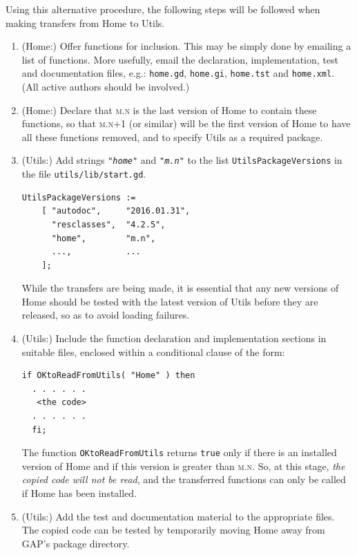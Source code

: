 \documentclass[a4paper,11pt]{report}
\begin{document}
{ Using this alternative procedure, the following steps will be followed when
making transfers from \textsf{Home} to \textsf{Utils}. 
\begin{enumerate}
\item  (\textsf{Home}:) Offer functions for inclusion. This may be simply done by emailing a list
of functions. More usefully, email the declaration, implementation, test and
documentation files, e.g.: \texttt{home.gd}, \texttt{home.gi}, \texttt{home.tst} and \texttt{home.xml}. (All active authors should be involved.) 
\item  (\textsf{Home}:) Declare that \textsc{m.n} is the last version of \textsf{Home} to contain these functions, so that \textsc{m.n+1} (or similar) will be the first version of \textsf{Home} to have all these functions removed, and to specify \textsf{Utils} as a required package. 
\item  (\textsf{Utils}:) Add strings \mbox{\texttt{\mdseries\slshape "home"}} and \mbox{\texttt{\mdseries\slshape "m.n"}} to the list \texttt{UtilsPackageVersions} in the file \texttt{utils/lib/start.gd}. 
\begin{Verbatim}[commandchars=!@|,fontsize=\small,frame=single,label=Example]
  UtilsPackageVersions := 
    [ "autodoc",     "2016.01.31", 
      "resclasses",  "4.2.5", 
      "home",        "m.n",
      ...,           ... 
    ];
\end{Verbatim}
 While the transfers are being made, it is essential that any new versions of \textsf{Home} should be tested with the latest version of \textsf{Utils} before they are released, so as to avoid loading failures. 
\item  (\textsf{Utils}:) Include the function declaration and implementation sections in suitable
files, enclosed within a conditional clause of the form: 
\begin{Verbatim}[commandchars=!@|,fontsize=\small,frame=single,label=Example]
  if OKtoReadFromUtils( "Home" ) then
  . . . . . . 
   <the code> 
  . . . . . . 
  fi;
\end{Verbatim}
  The function \texttt{OKtoReadFromUtils} returns \texttt{true} only if there is an installed version of \textsf{Home} and if this version is greater than \textsc{m.n}. So, at this stage, \emph{the copied code will not be read}, and the transferred functions can only be called if \textsf{Home} has been installed. 
\item  (\textsf{Utils}:) Add the test and documentation material to the appropriate files. The
copied code can be tested by temporarily moving \textsf{Home} away from \textsf{GAP}'s package directory. 

\end{enumerate}}
\end{document}
